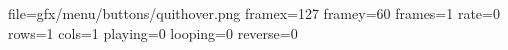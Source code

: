 file=gfx/menu/buttons/quithover.png
framex=127
framey=60
frames=1
rate=0
rows=1
cols=1
playing=0
looping=0
reverse=0